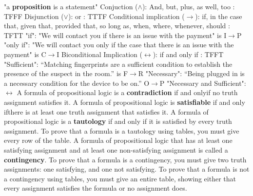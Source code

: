 \documentclass{article}
\begin{document}
"a \textbf{proposition} is a statement"\newline
Conjuction ($\wedge$): And, but, plus, as well, too : TFFF\newline\newline
Disjunction ($\lor$): or : TTTF\newline\newline
Conditional implication ($\rightarrow$): if, in the case that, given that, provided that, so long as, when, where, whenever, should : TFTT\newline\newline
"if": "We will contact you if there is an issue with the payment" is I$\rightarrow$P\newline\newline
"only if": "We will contact you only if the case that there is an issue with the payment" is C$\rightarrow$I\newline\newline
Biconditional Implication ($\leftrightarrow$): if and only if : TFFT\newline\newline
"Sufficient": “Matching fingerprints are a sufficient condition to establish the presence of the suspect in the room.” is F$\rightarrow$R\newline\newline
"Necessary": “Being plugged in is a necessary condition for the device to be on.” O$\rightarrow$P\newline\newline
"Necessary and Sufficient": $\leftrightarrow$\newline\newline
A formula of propositional logic is a \textbf{contradiction} if and onlyif no truth assignment satisfies it.\newline
A formula of propositional logic is \textbf{satisfiable} if and only ifthere is at least one truth assignment that satisfies it.\newline
A formula of propositional logic is a \textbf{tautology} if and only if it is satisfied by every truth assignment. To prove that a formula is a tautology using tables, you must give every row of the table.\newline
A formula of propositional logic that has at least one satisfying assignment and at least one non-satisfying assignment is called a \textbf{contingency}. To prove that a formula is a contingency,  you  must  give two truth assignments: one satisfying, and one not satisfying. To prove that a formula is not a contingency using tables, you must give an entire table, showing either that every assignment satisfies the formula or no assignment does.\newline\newline
\end{document}
